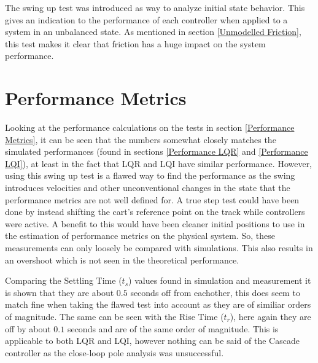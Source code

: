 The swing up test was introduced as way to analyze initial state behavior. This gives an indication to the performance of each controller when applied to a system in an unbalanced state. As mentioned in section \ref{Unmodelled Friction}, this test makes it clear that friction has a huge impact on the system performance.

\section{Performance Metrics}
Looking at the performance calculations on the tests in section \ref{Performance Metrics}, it can be seen that the numbers somewhat closely matches the simulated performances (found in sections \ref{Performance LQR} and \ref{Performance LQI}), at least in the fact that LQR and LQI have similar performance. However, using this swing up test is a flawed way to find the performance as the swing introduces velocities and other unconventional changes in the state that the performance metrics are not well defined for. A true step test could have been done by instead shifting the cart's reference point on the track while controllers were active. A benefit to this would have been cleaner initial positions to use in the estimation of performance metrics on the physical system. So, these measurements can only loosely be compared with simulations. This also results in an overshoot which is not seen in the theoretical performance.

Comparing the Settling Time ($t_s$) values found in simulation and measurement it is shown that they are about $0.5$ seconds off from eachother, this does seem to match fine when taking the flawed test into account as they are of similiar orders of magnitude. The same can be seen with the Rise Time ($t_r$), here again they are off by about $0.1$ seconds and are of the same order of magnitude. This is applicable to both LQR and LQI, however nothing can be said of the Cascade controller as the close-loop pole analysis was unsuccessful.